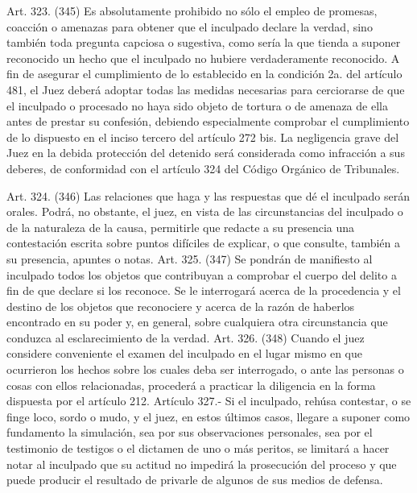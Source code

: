     Art. 323. (345) Es absolutamente prohibido no sólo el empleo de promesas, coacción o amenazas para obtener que el inculpado declare la verdad, sino también toda pregunta capciosa o sugestiva, como sería la que tienda a suponer reconocido un hecho que el inculpado no hubiere verdaderamente reconocido.
    A fin de asegurar el cumplimiento de lo establecido en la condición 2a. del artículo 481, el Juez deberá adoptar todas las medidas necesarias para cerciorarse de que el inculpado o procesado no haya sido objeto de tortura o de amenaza de ella antes de prestar su confesión,  debiendo especialmente comprobar el cumplimiento de lo dispuesto en el inciso tercero del artículo 272 bis. La negligencia grave del Juez en la debida protección del detenido será considerada como infracción a sus deberes, de conformidad con el artículo 324 del Código Orgánico de Tribunales.



    Art. 324. (346) Las relaciones que haga y las respuestas que dé el inculpado serán orales.
    Podrá, no obstante, el juez, en vista de las circunstancias del inculpado o de la naturaleza de la causa, permitirle que redacte a su presencia una contestación escrita sobre puntos difíciles de explicar, o que consulte, también a su presencia, apuntes o notas.
    Art. 325. (347) Se pondrán de manifiesto al inculpado todos los objetos que contribuyan a comprobar el cuerpo del delito a fin de que declare si los reconoce. Se le interrogará acerca de la procedencia y el destino de los objetos que reconociere y acerca de la razón de haberlos encontrado en su poder y, en general, sobre cualquiera otra circunstancia que conduzca al esclarecimiento de la verdad.
    Art. 326. (348) Cuando el juez considere conveniente el examen del inculpado en el lugar mismo en que ocurrieron los hechos sobre los cuales deba ser interrogado, o ante las personas o cosas con ellos relacionadas, procederá a practicar la diligencia en la forma dispuesta por el artículo 212.
    Artículo 327.- Si el inculpado, rehúsa contestar, o se finge loco, sordo o mudo, y el juez, en estos últimos casos, llegare a suponer como fundamento la simulación, sea por sus observaciones personales, sea por el testimonio de testigos o el dictamen de uno o más peritos, se limitará a hacer notar al inculpado que su actitud no impedirá la prosecución del proceso y que puede producir el resultado de privarle de algunos de sus medios de defensa.

